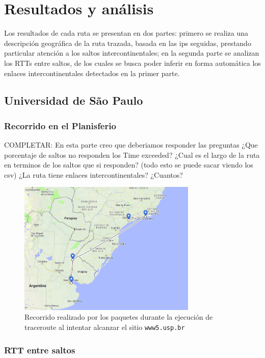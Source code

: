 \section{Resultados y análisis}

Los resultados de cada ruta se presentan en dos partes: primero se realiza una descripción geográfica de la ruta trazada, basada en las ips seguidas, prestando particular atención a los saltos intercontinentales; en la segunda parte se analizan los RTTs entre saltos, de los cuales se busca poder inferir en forma automática los enlaces intercontinentales detectados en la primer parte.

\subsection*{Universidad de São Paulo}

\subsubsection*{Recorrido en el Planisferio}

COMPLETAR: En esta parte creo que deberiamos responder las preguntas 
¿Que porcentaje de saltos no responden los Time exceeded? ¿Cual es el largo de la ruta en terminos de
los saltos que si responden? (todo esto se puede sacar viendo los csv)
¿La ruta tiene enlaces intercontinentales? ¿Cuantos?

\begin{figure}[H]
  \centering
  \includegraphics[width=8.5cm]{figs/saopaulo.png}
  \caption{\footnotesize Recorrido realizado por los paquetes durante la ejecución de traceroute al intentar alcanzar el sitio \texttt{www5.usp.br}}
\end{figure}

\subsubsection*{RTT entre saltos}

